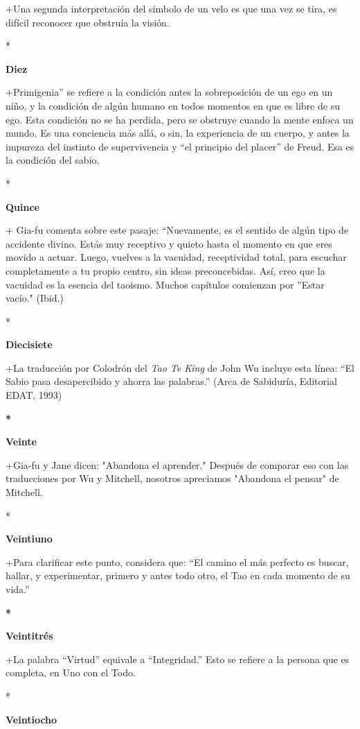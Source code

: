 +Una segunda interpretación del símbolo de un velo es que una vez se
tira, es difícil reconocer que obstruía la visión.

*

\textbf{Diez}

+Primigenia'' se refiere a la condición antes la sobreposición de un ego
en un niño, y la condición de algún humano en todos momentos en que es
libre de su ego. Esta condición no se ha perdida, pero se obstruye
cuando la mente enfoca un mundo. Es una conciencia más allá, o sin, la
experiencia de un cuerpo, y antes la impureza del instinto de
supervivencia y ``el principio del placer'' de Freud. Esa es la
condición del sabio.

*

\textbf{Quince}

+ Gia-fu comenta sobre este pasaje: ``Nuevamente, es el sentido de algún
tipo de accidente divino. Estás muy receptivo y quieto hasta el momento
en que eres movido a actuar. Luego, vuelves a la vacuidad, receptividad
total, para escuchar completamente a tu propio centro, sin ideas
preconcebidas. Así, creo que la vacuidad es la esencia del taoismo.
Muchos capítulos comienzan por ''Estar vacío." (Ibid.)

*

\textbf{Diecisiete}

+La traducción por Colodrón del \emph{Tao Te King} de John Wu incluye
esta línea: ``El Sabio pasa desapercibido y ahorra las palabras.'' (Arca
de Sabiduría, Editorial EDAT, 1993)

\textbf{*}

\textbf{Veinte}

+Gia-fu y Jane dicen: "Abandona el aprender." Después de comparar eso
con las traducciones por Wu y Mitchell, nosotros apreciamos "Abandona el
pensar" de Mitchell.

*

\textbf{Veintiuno}

+Para clarificar este punto, considera que: ``El camino el más perfecto
es buscar, hallar, y experimentar, primero y antes todo otro, el Tao en
cada momento de su vida.''

\textbf{*}

\textbf{Veintitrés}

+La palabra ``Virtud'' equivale a ``Integridad.'' Esto se refiere a la
persona que es completa, en Uno con el Todo.

*

\textbf{Veintiocho}

